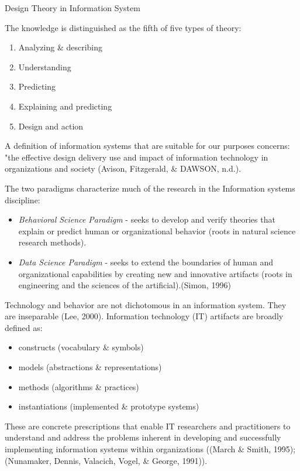 \documentclass[print]{nuthesis}
\providecommand{\tightlist}{%
  \setlength{\itemsep}{0pt}\setlength{\parskip}{0pt}}
\begin{document}
Design Theory in Information System

The knowledge is distinguished as the fifth of five types of theory:

\begin{enumerate}
\def\labelenumi{\arabic{enumi}.}
\tightlist
\item
  Analyzing \& describing
\item
  Understanding
\item
  Predicting
\item
  Explaining and predicting
\item
  Design and action
\end{enumerate}

A definition of information systems that are suitable for our purposes concerns: "the effective design delivery use and impact of information technology in organizations and society (Avison, Fitzgerald, \& DAWSON, n.d.).

The two paradigms characterize much of the research in the Information systems discipline:

\begin{itemize}
\tightlist
\item
  \emph{Behavioral Science Paradigm} - seeks to develop and verify theories that explain or predict human or organizational behavior (roots in natural science research methods).
\item
  \emph{Data Science Paradigm} - seeks to extend the boundaries of human and organizational capabilities by creating new and innovative artifacts (roots in engineering and the sciences of the artificial).(Simon, 1996)
\end{itemize}

Technology and behavior are not dichotomous in an information system. They are inseparable (Lee, 2000). Information technology (IT) artifacts are broadly defined as:

\begin{itemize}
\tightlist
\item
  constructs (vocabulary \& symbols)
\item
  models (abstractions \& representations)
\item
  methods (algorithms \& practices)
\item
  instantiations (implemented \& prototype systems)
\end{itemize}

These are concrete prescriptions that enable IT researchers and practitioners to understand and address the problems inherent in developing and successfully implementing information systems within organizations ((March \& Smith, 1995); (Nunamaker, Dennis, Valacich, Vogel, \& George, 1991)).
\end{document}

